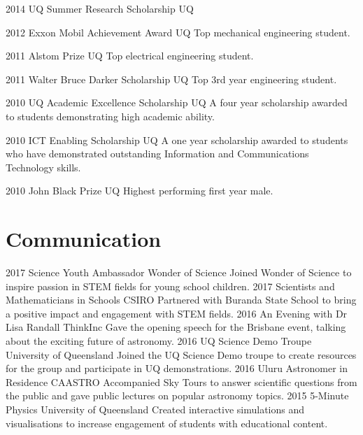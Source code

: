 \documentclass[]{friggeri-cv} %
\begin{document}
\begin{entrylist}
\entryInlineSmall
{2014}
{UQ Summer Research Scholarship}
{UQ}
{}
\end{entrylist}
\begin{entrylist}
\entryInlineSmall
{2012}
{Exxon Mobil Achievement Award}
{UQ}
{Top mechanical engineering student.}
\end{entrylist}
\begin{entrylist}
\entryInlineSmall
{2011}
{Alstom Prize}
{UQ}
{Top electrical engineering student.}
\end{entrylist}
\begin{entrylist}
\entryInlineSmall
{2011}
{Walter Bruce Darker Scholarship}
{UQ}
{Top 3rd year engineering student.}
\end{entrylist}
\begin{entrylist}
\entryInlineSmall
{2010}
{UQ Academic Excellence Scholarship}
{UQ}
{A four year scholarship awarded to students demonstrating high academic ability.}
\end{entrylist}
\begin{entrylist}
\entryInlineSmall
{2010}
{ICT Enabling Scholarship}
{UQ}
{A one year scholarship awarded to students who have demonstrated outstanding Information and Communications Technology skills.}
\end{entrylist}
\begin{entrylist}
\entryInlineSmall
{2010}
{John Black Prize}
{UQ}
{Highest performing first year male.}
\end{entrylist}

\section{Communication}

\begin{entrylist}
\entry
{2017}
{Science Youth Ambassador}
{Wonder of Science}
{Joined Wonder of Science to inspire passion in STEM fields for young school children.}
%
\entry
{2017}
{Scientists and Mathematicians in Schools}
{CSIRO}
{Partnered with Buranda State School to bring a positive impact and engagement with STEM fields.}
%
\entry
{2016}
{An Evening with Dr Lisa Randall}
{ThinkInc}
{Gave the opening speech for the Brisbane event, talking about the exciting future of astronomy.}
%
\entry
{2016}
{UQ Science Demo Troupe}
{University of Queensland}
{Joined the UQ Science Demo troupe to create resources for the group and participate in UQ demonstrations.}
%
\entry
{2016}
{Uluru Astronomer in Residence}
{CAASTRO}
{Accompanied Sky Tours to answer scientific questions from the public and gave public lectures on popular astronomy topics.}
%
\entry
{2015}
{5-Minute Physics}
{University of Queensland}
{Created interactive simulations and visualisations to increase engagement of students with educational content.}
\end{entrylist}
\end{document}
